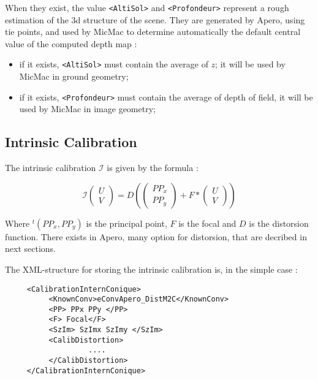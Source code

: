 When they exist, the value {\tt <AltiSol>} and {\tt <Profondeur>} represent a rough estimation of the
3d structure of the scene. They are generated by Apero, using tie points, and used by MicMac to determine automatically
the default central value of the computed depth map :


\begin{itemize}
   \item  if it exists, {\tt <AltiSol>} must contain  the average of $z$;
         it will be used by MicMac in ground geometry;
   \item if it exists,  {\tt <Profondeur>} must contain  the average of depth of field,
         it will be used by MicMac in image geometry;
\end{itemize}



\subsection{Intrinsic Calibration}

The intrinsic calibration  $ \mathcal{I} $ is given by the formula :

\begin{equation}
   \mathcal{I}\begin{pmatrix} U \\ V \end{pmatrix} 
   = D\left(\begin{pmatrix} PP_x \\ PP_y \end{pmatrix}   + F* \begin{pmatrix} U \\ V \end{pmatrix}\right)
\end{equation}


Where $^t(PP_x,PP_y)$ is the principal point, $F$ is the focal and $D$ is the distorsion function.
There  exists in Apero, many option for distorsion, that are decribed in next sections.

The XML-structure for storing the intrinsic calibration is, in the simple case :

\begin{verbatim}
     <CalibrationInternConique>
          <KnownConv>eConvApero_DistM2C</KnownConv>
          <PP> PPx PPy </PP>
          <F> Focal</F>
          <SzIm> SzImx SzImy </SzIm>
          <CalibDistortion>
                   ....
          </CalibDistortion>
     </CalibrationInternConique>
\end{verbatim}

